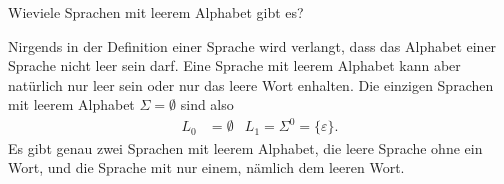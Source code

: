Wieviele Sprachen mit leerem Alphabet gibt es?

\begin{loesung}
Nirgends in der Definition einer Sprache wird verlangt, dass das
Alphabet einer Sprache nicht leer sein darf. Eine Sprache mit leerem
Alphabet kann aber natürlich nur leer sein oder nur das leere Wort
enhalten. Die einzigen Sprachen mit leerem Alphabet $\Sigma=\emptyset$
sind also
\begin{align*}
L_0&=\emptyset& L_1=\Sigma^0=\{\varepsilon\}.
\end{align*}
Es gibt genau zwei Sprachen mit leerem Alphabet, die leere Sprache ohne
ein Wort, und die Sprache mit nur einem, nämlich dem leeren Wort.
\end{loesung}

